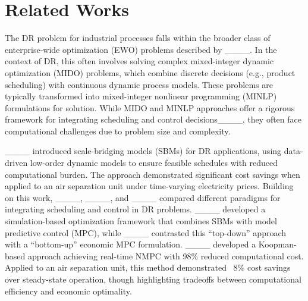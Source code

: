 \section{Related Works}
The DR problem for industrial processes falls within the broader class of enterprise-wide optimization (EWO) problems described by ____. In the context of DR, this often involves solving complex mixed-integer dynamic optimization (MIDO) problems, which combine discrete decisions (e.g., product scheduling) with continuous dynamic process models. These problems are typically transformed into mixed-integer nonlinear programming (MINLP) formulations for solution. While MIDO and MINLP approaches offer a rigorous framework for integrating scheduling and control decisions____, they often face computational challenges due to problem size and complexity.


____ introduced scale-bridging models (SBMs) for DR applications, using data-driven low-order dynamic models to ensure feasible schedules with reduced computational burden. The approach demonstrated significant cost savings when applied to an air separation unit under time-varying electricity prices. Building on this work, ____, ____, and ____ compared different paradigms for integrating scheduling and control in DR problems. ____ developed a simulation-based optimization framework that combines SBMs with model predictive control (MPC), while ____ contrasted this ``top-down'' approach with a ``bottom-up'' economic MPC formulation. ____ developed a Koopman-based approach achieving real-time NMPC with 98\% reduced computational cost. Applied to an air separation unit, this method demonstrated ~8\% cost savings over steady-state operation, though highlighting tradeoffs between computational efficiency and economic optimality.

